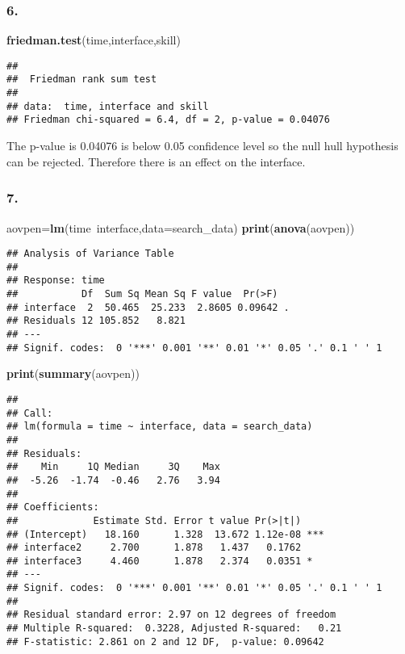 \documentclass[11pt,]{article}
\newenvironment{Shaded}{\begin{snugshade}}{\end{snugshade}}
\newcommand{\KeywordTok}[1]{\textcolor[rgb]{0.13,0.29,0.53}{\textbf{{#1}}}}
\newcommand{\DataTypeTok}[1]{\textcolor[rgb]{0.13,0.29,0.53}{{#1}}}
\newcommand{\NormalTok}[1]{{#1}}
\begin{document}
\subsubsection{6.}\label{section-10}

\begin{Shaded}
\begin{Highlighting}[]
\KeywordTok{friedman.test}\NormalTok{(time,interface,skill)}
\end{Highlighting}
\end{Shaded}

\begin{verbatim}
## 
##  Friedman rank sum test
## 
## data:  time, interface and skill
## Friedman chi-squared = 6.4, df = 2, p-value = 0.04076
\end{verbatim}

The p-value is 0.04076 is below 0.05 confidence level so the null hull
hypothesis can be rejected. Therefore there is an effect on the
interface.

\subsubsection{7.}\label{section-11}

\begin{Shaded}
\begin{Highlighting}[]
\NormalTok{aovpen=}\KeywordTok{lm}\NormalTok{(time~interface,}\DataTypeTok{data=}\NormalTok{search_data)}
\KeywordTok{print}\NormalTok{(}\KeywordTok{anova}\NormalTok{(aovpen))}
\end{Highlighting}
\end{Shaded}

\begin{verbatim}
## Analysis of Variance Table
## 
## Response: time
##           Df  Sum Sq Mean Sq F value  Pr(>F)  
## interface  2  50.465  25.233  2.8605 0.09642 .
## Residuals 12 105.852   8.821                  
## ---
## Signif. codes:  0 '***' 0.001 '**' 0.01 '*' 0.05 '.' 0.1 ' ' 1
\end{verbatim}

\begin{Shaded}
\begin{Highlighting}[]
\KeywordTok{print}\NormalTok{(}\KeywordTok{summary}\NormalTok{(aovpen))}
\end{Highlighting}
\end{Shaded}

\begin{verbatim}
## 
## Call:
## lm(formula = time ~ interface, data = search_data)
## 
## Residuals:
##    Min     1Q Median     3Q    Max 
##  -5.26  -1.74  -0.46   2.76   3.94 
## 
## Coefficients:
##             Estimate Std. Error t value Pr(>|t|)    
## (Intercept)   18.160      1.328  13.672 1.12e-08 ***
## interface2     2.700      1.878   1.437   0.1762    
## interface3     4.460      1.878   2.374   0.0351 *  
## ---
## Signif. codes:  0 '***' 0.001 '**' 0.01 '*' 0.05 '.' 0.1 ' ' 1
## 
## Residual standard error: 2.97 on 12 degrees of freedom
## Multiple R-squared:  0.3228, Adjusted R-squared:   0.21 
## F-statistic: 2.861 on 2 and 12 DF,  p-value: 0.09642
\end{verbatim}
\end{document}
